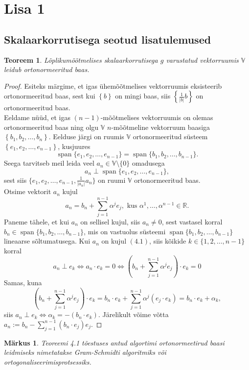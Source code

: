 \documentclass[a4paper,12pt]{article}
\newtheorem{teoreem}{Teoreem}[section]
\newtheorem{markus}{Märkus}[section]
\numberwithin{equation}{section}
\DeclareMathOperator{\spn}{span}
\begin{document}
\newpage
\section{Lisa 1}
\subsection{Skalaarkorrutisega seotud lisatulemused}

\begin{teoreem}
Lõplikumõõtmelises skalaarkorrutisega $g$ varustatud vektorruumis $\mathbb{V}$ leidub ortonormeeritud baas.
\end{teoreem}
\begin{proof}
Esiteks märgime, et igas ühemõõtmelises vektorruumis eksisteerib ortonormeeritud baas, sest kui $\left\lbrace b \right\rbrace$ on mingi baas, siis $\left\lbrace \frac{1}{|b|} b\right\rbrace$ on ortonormeeritud baas.\\
Eeldame nüüd, et igas $(n-1)$-mõõtmelises vektorruumis on olemas ortonormeeritud baas ning olgu $\mathbb{V}$ $n$-mõõtmeline vektorruum baasiga $\left\lbrace b_1, b_2, \dots, b_n \right\rbrace$. Eelduse järgi on ruumis $\mathbb{V}$ ortonormeeritud süsteem $\left\lbrace e_1, e_2, \dots, e_{n-1} \right\rbrace$, kusjuures
\[ \spn\{ e_1, e_2, \dots, e_{n-1}\} = \spn\{ b_1, b_2, \dots, b_{n-1}\}. \]
Seega tarvitseb meil leida veel $a_n \in \mathbb{V} \setminus \{0\}$ omadusega
\[a_n \perp \spn\{ e_1, e_2, \dots, e_{n-1}\},\]
sest siis $\{ e_1, e_2, \dots, e_{n-1}, \frac{1}{|a_n|}a_n\}$ on ruumi $\mathbb{V}$ ortonormeeritud baas.\\
Otsime vektorit $a_n$ kujul
\begin{equation}
a_n = b_n + \sum_{j = 1}^{n-1} \alpha^j e_j, \text{ kus } \alpha^1, \dots, \alpha^{n-1} \in \mathbb{R}.
\end{equation}
Paneme tähele, et kui $a_n$ on sellisel kujul, siis $a_n \neq 0$, sest vastasel korral $b_n \in \spn\{ b_1, b_2, \dots, b_{n-1}\}$, mis on vastuolus süsteemi $\spn\{ b_1, b_2, \dots, b_{n-1}\}$ lineaarse sõltumatusega.
Kui $a_n$ on kujul $(4.1)$, siis kõikide $k \in \{1, 2, \dots, n-1\}$ korral
\begin{equation*}
a_n \perp e_k \iff a_n \cdot e_k = 0 \iff \left(b_n + \sum_{j = 1}^{n-1} \alpha^j e_j\right) \cdot e_k = 0
\end{equation*}
Samas, kuna
\begin{equation*}
\left(b_n + \sum_{j = 1}^{n-1} \alpha^j e_j\right) \cdot e_k = b_n \cdot e_k + \sum_{j = 1}^{n-1} \alpha^j \left(e_j \cdot e_k \right) = b_n \cdot e_k + \alpha_k,
\end{equation*}
siis $a_n \perp e_k \iff \alpha_k = - \left(b_n \cdot e_k \right)$. Järelikult võime võtta $a_n := b_n - \sum_{j=1}^{n-1}\left(b_n \cdot e_j\right)e_j$.
\end{proof}
\begin{markus}
Teoreemi 4.1 tõestuses antud algortimi ortonormeetirud baasi leidmiseks nimetatakse \emph{Gram-Schmidti algoritmiks} või \emph{ortogonaliseerimisprotsessiks}.
\end{markus}
\end{document}
